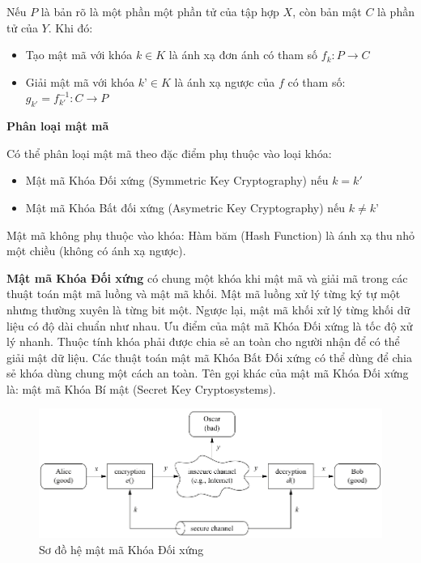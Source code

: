 Nếu $P$ là bản rõ là một phần một phần tử của tập hợp $X$, còn bản mật $C$ là phần tử của $Y$. Khi đó:

\begin{itemize}
\item Tạo mật mã với khóa $k \in K $ là ánh xạ đơn ánh có tham số $f_k: P \to C$
\item Giải mật mã với khóa $k’ \in K $ là ánh xạ ngược của $f$ có tham số: $ g_{k'} = f_{k'}^{-1} : C \to P $
\end{itemize}

\textbf{Phân loại mật mã}

Có thể phân loại mật mã theo đặc điểm phụ thuộc vào loại khóa:

\begin{itemize}
\item Mật mã Khóa Đối xứng (Symmetric Key Cryptography) nếu $k=k'$
\item Mật mã Khóa Bất đối xứng (Asymetric Key Cryptography) nếu $k ≠ k’$
\end{itemize}

Mật mã không phụ thuộc vào khóa: Hàm băm (Hash Function) là ánh xạ thu nhỏ một chiều (không có ánh xạ ngược).

\textbf{Mật mã Khóa Đối xứng} có chung một khóa khi mật mã và giải mã trong các thuật toán mật mã luồng và mật mã khối. Mật mã luồng xử lý từng ký tự một nhưng thường xuyên là từng bit một. Ngược lại, mật mã khối xử lý từng khối dữ liệu có độ dài chuẩn như nhau. Ưu điểm của mật mã Khóa Đối xứng là tốc độ xử lý nhanh. Thuộc tính khóa phải được chia sẻ an toàn cho người nhận để có thể giải mật dữ liệu. Các thuật toán mật mã Khóa Bất Đối xứng có thể dùng để chia sẻ khóa dùng chung một cách an toàn. Tên gọi khác của mật mã Khóa Đối xứng là: mật mã Khóa Bí mật (Secret Key Cryptosystems).

\begin{figure}[htbp]
\centering
\includegraphics[width=.9\linewidth]{img/sym_alg.png}
\caption{Sơ đồ hệ mật mã Khóa Đối xứng}
\label{fig:sym_alg}
\end{figure}

